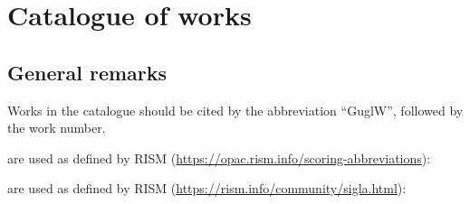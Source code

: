 \documentclass[abbrwidth=7em,shorttitlesize=55]{ees}
\begin{document}
\bigskip
{}


\cleardoublepage
\chapter{Catalogue of works}

\section{General remarks}

Works in the catalogue should be cited by the abbreviation “GuglW”, followed by the work number.

 are used as defined by RISM (\url{https://opac.rism.info/scoring-abbreviations}):
\begin{abbreviations}
\end{abbreviations}

 are used as defined by RISM (\url{https://rism.info/community/sigla.html}):
\end{document}
